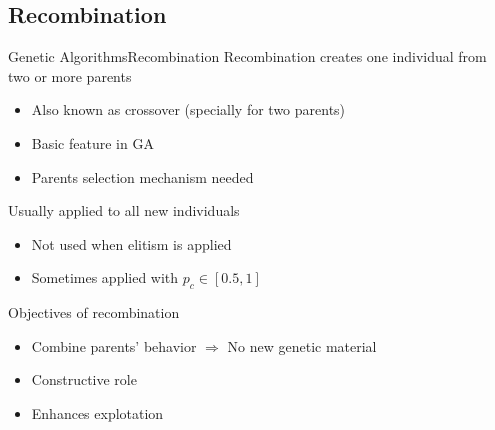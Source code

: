 \documentclass[10pt,compress]{beamer} %
\begin{document}
\subsection{Recombination}
\begin{frame}{Genetic Algorithms}{Recombination}
	Recombination creates one individual from two or more parents
	\begin{itemize}
		\item Also known as crossover (specially for two parents)
		\item Basic feature in GA
		\item Parents selection mechanism needed
	\end{itemize}
	Usually applied to all new individuals
	\begin{itemize}
		\item Not used when elitism is applied
		\item Sometimes applied with $p_c \in [0.5, 1]$ 
	\end{itemize}
	Objectives of recombination
	\begin{itemize}
		\item Combine parents' behavior $\Rightarrow$ No new genetic material
		\item Constructive role
		\item Enhances explotation
	\end{itemize}
\end{frame}
\end{document}

